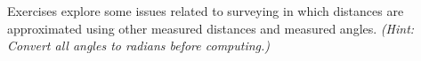 {\noindent Exercises}
{ explore some issues related to surveying in which distances are approximated using other measured distances and measured angles. \textit{(Hint: Convert all angles to radians before computing.)}
}

